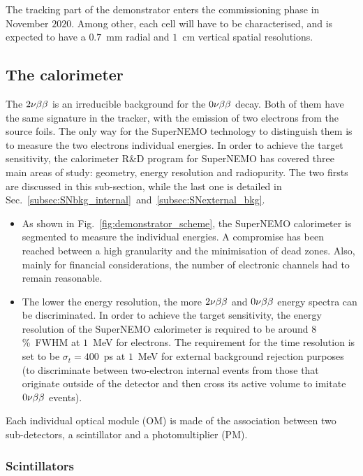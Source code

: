 The tracking part of the demonstrator enters the commissioning phase in November $2020$.
Among other, each cell will have to be characterised, and is expected to have a $0.7$~mm radial and $1$~cm vertical spatial resolutions.


\subsection{The calorimeter}
\label{subsec:SN_calo}

The $2\nu\beta\beta$ is an irreducible background for the $0\nu\beta\beta$ decay.
Both of them have the same signature in the tracker, with the emission of two electrons from the source foils.
The only way for the SuperNEMO technology to distinguish them is to measure the two electrons individual energies.
In order to achieve the target sensitivity, the calorimeter R\&D program for SuperNEMO has covered three main areas of study: geometry, energy resolution and radiopurity.
The two firsts are discussed in this sub-section, while the last one is detailed in Sec.~\ref{subsec:SNbkg_internal}~and~\ref{subsec:SNexternal_bkg}.
\begin{itemize}
\item As shown in Fig.~\ref{fig:demonstrator_scheme}, the SuperNEMO calorimeter is segmented to measure the individual energies.
A compromise has been reached between a high granularity and the minimisation of dead zones.
Also, mainly for financial considerations, the number of electronic channels had to remain reasonable.
\item The lower the energy resolution, the more $2\nu\beta\beta$ and $0\nu\beta\beta$ energy spectra can be discriminated.
In order to achieve the target sensitivity, the energy resolution of the SuperNEMO calorimeter is required to be around $8$\%~FWHM at $1$~MeV for electrons.
The requirement for the time resolution is set to be ${\sigma_{t}=400}$~ps at $1$~MeV for external background rejection purposes (to discriminate between two-electron internal events from those that originate outside of the detector and then cross its active volume to imitate $0\nu\beta\beta$ events).
\end{itemize}
Each individual optical module (OM) is made of the association between two sub-detectors, a scintillator and a photomultiplier (PM).


\subsubsection*{Scintillators}

